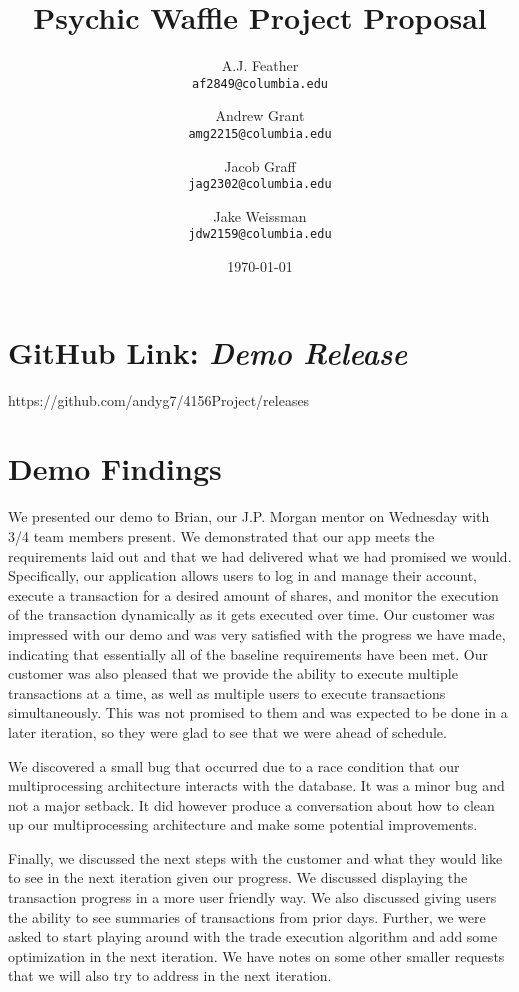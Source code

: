 \documentclass{article}
\title{Psychic Waffle Project Proposal}
\author{
    A.J. Feather\\
    \texttt{af2849@columbia.edu}
    \and
    Andrew Grant\\
    \texttt{amg2215@columbia.edu}
    \and
    Jacob Graff\\
    \texttt{jag2302@columbia.edu}
    \and
    Jake Weissman\\
    \texttt{jdw2159@columbia.edu}
}
\date{\today}
\begin{document}
\maketitle

\section{GitHub Link: \textit{Demo Release}}
https://github.com/andyg7/4156Project/releases

\section{Demo Findings}
We presented our demo to Brian, our J.P. Morgan mentor on Wednesday with 3/4 team members present. We demonstrated that our app meets the requirements laid out and that we had delivered what we had promised we would. Specifically, our application allows users to log in and manage their account, execute a transaction for a desired amount of shares, and monitor the execution of the transaction dynamically as it gets executed over time. Our customer was impressed with our demo and was very satisfied with the progress we have made, indicating that essentially all of the baseline requirements have been met. Our customer was also pleased that we provide the ability to execute multiple transactions at a time, as well as multiple users to execute transactions simultaneously. This was not promised to them and was expected to be done in a later iteration, so they were glad to see that we were ahead of schedule.

We discovered a small bug that occurred due to a race condition that our multiprocessing architecture interacts with the database. It was a minor bug and not a major setback. It did however produce a conversation about how to clean up our multiprocessing architecture and make some potential improvements.

Finally, we discussed the next steps with the customer and what they would like to see in the next iteration given our progress. We discussed displaying the transaction progress in a more user friendly way. We also discussed giving users the ability to see summaries of transactions from prior days. Further, we were asked to start playing around with the trade execution algorithm and add some optimization in the next iteration. We have notes on some other smaller requests that we will also try to address in the next iteration.
\end{document}
